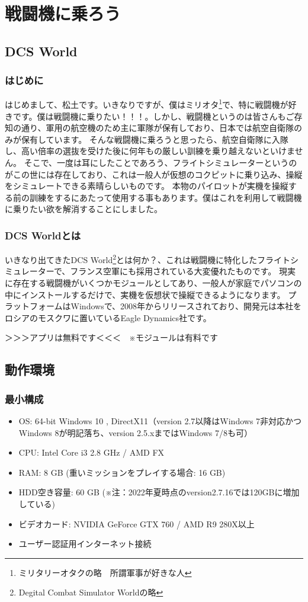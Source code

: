 \section{戦闘機に乗ろう}
\subsection{DCS World}
\subsubsection{はじめに}
はじめまして、松土です。いきなりですが、僕はミリオタ\footnote{ミリタリーオタクの略　所謂軍事が好きな人}で、特に戦闘機が好きです。僕は戦闘機に乗りたい！！！。しかし、戦闘機というのは皆さんもご存知の通り、軍用の航空機のため主に軍隊が保有しており、日本では航空自衛隊のみが保有しています。
そんな戦闘機に乗ろうと思ったら、航空自衛隊に入隊し、高い倍率の選抜を受けた後に何年もの厳しい訓練を乗り越えないといけません。
そこで、一度は耳にしたことであろう、フライトシミュレーターというのがこの世には存在しており、これは一般人が仮想のコクピットに乗り込み、操縦をシミュレートできる素晴らしいものです。
本物のパイロットが実機を操縦する前の訓練をするにあたって使用する事もあります。僕はこれを利用して戦闘機に乗りたい欲を解消することにしました。
\subsubsection{DCS Worldとは}
いきなり出てきたDCS World\footnote{Degital Combat Simulator Worldの略}とは何か？、これは戦闘機に特化したフライトシミュレーターで、フランス空軍にも採用されている大変優れたものです。
現実に存在する戦闘機がいくつかモジュールとしてあり、一般人が家庭でパソコンの中にインストールするだけで、実機を仮想状で操縦できるようになります。
プラットフォームはWindowsで、2008年からリリースされており、開発元は本社をロシアのモスクワに置いているEagle Dynamics社です。


＞＞＞アプリは無料です＜＜＜　※モジュールは有料です
\subsection{動作環境}
\subsubsection{最小構成}
\begin{itemize}
  \item OS: 64-bit Windows 10 , DirectX11（version 2.7以降はWindows 7非対応かつWindows 8が明記落ち、version 2.5.xまではWindows 7/8も可）
  \item CPU: Intel Core i3 2.8 GHz / AMD FX
  \item RAM: 8 GB (重いミッションをプレイする場合: 16 GB)
  \item HDD空き容量: 60 GB (※注：2022年夏時点のversion2.7.16では120GBに増加している)
  \item ビデオカード: NVIDIA GeForce GTX 760 / AMD R9 280X以上
  \item ユーザー認証用インターネット接続
\end{itemize}

